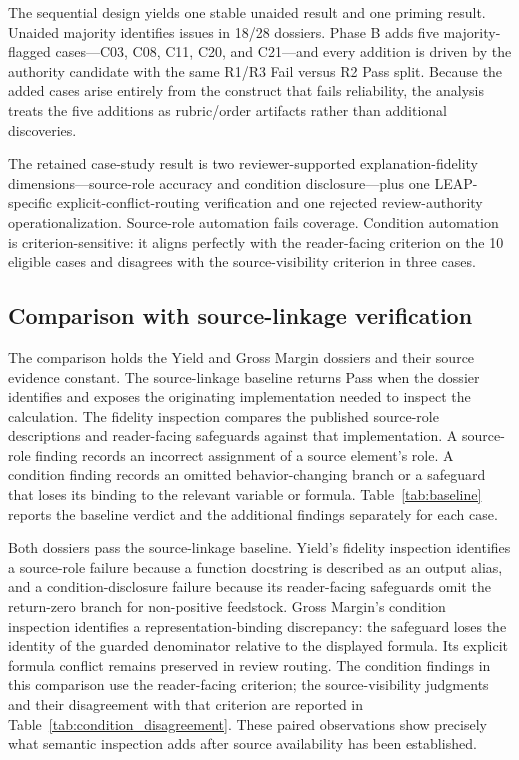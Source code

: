 \documentclass[a4paper,fleqn]{cas-dc}
\begin{document}
The sequential design yields one stable unaided result and one priming result. Unaided majority identifies issues in 18/28 dossiers. Phase B adds five majority-flagged cases---C03, C08, C11, C20, and C21---and every addition is driven by the authority candidate with the same R1/R3 Fail versus R2 Pass split. Because the added cases arise entirely from the construct that fails reliability, the analysis treats the five additions as rubric/order artifacts rather than additional discoveries.

The retained case-study result is two reviewer-supported explanation-fidelity dimensions---source-role accuracy and condition disclosure---plus one LEAP-specific explicit-conflict-routing verification and one rejected review-authority operationalization. Source-role automation fails coverage. Condition automation is criterion-sensitive: it aligns perfectly with the reader-facing criterion on the 10 eligible cases and disagrees with the source-visibility criterion in three cases.

\subsection{Comparison with source-linkage verification}
The comparison holds the Yield and Gross Margin dossiers and their source evidence constant. The source-linkage baseline returns Pass when the dossier identifies and exposes the originating implementation needed to inspect the calculation. The fidelity inspection compares the published source-role descriptions and reader-facing safeguards against that implementation. A source-role finding records an incorrect assignment of a source element's role. A condition finding records an omitted behavior-changing branch or a safeguard that loses its binding to the relevant variable or formula. Table~\ref{tab:baseline} reports the baseline verdict and the additional findings separately for each case.

Both dossiers pass the source-linkage baseline. Yield's fidelity inspection identifies a source-role failure because a function docstring is described as an output alias, and a condition-disclosure failure because its reader-facing safeguards omit the return-zero branch for non-positive feedstock. Gross Margin's condition inspection identifies a representation-binding discrepancy: the safeguard loses the identity of the guarded denominator relative to the displayed formula. Its explicit formula conflict remains preserved in review routing. The condition findings in this comparison use the reader-facing criterion; the source-visibility judgments and their disagreement with that criterion are reported in Table~\ref{tab:condition_disagreement}. These paired observations show precisely what semantic inspection adds after source availability has been established.
\end{document}
